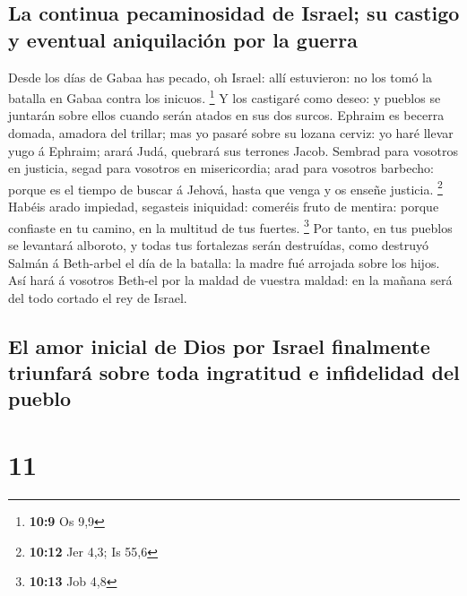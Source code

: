 \hypertarget{la-continua-pecaminosidad-de-israel-su-castigo-y-eventual-aniquilaciuxf3n-por-la-guerra}{%
\subsection{La continua pecaminosidad de Israel; su castigo y eventual
aniquilación por la
guerra}\label{la-continua-pecaminosidad-de-israel-su-castigo-y-eventual-aniquilaciuxf3n-por-la-guerra}}

 Desde los días de Gabaa has pecado, oh Israel: allí
estuvieron: no los tomó la batalla en Gabaa contra los inicuos.
\footnote{\textbf{10:9} Os 9,9}  Y los castigaré como
deseo: y pueblos se juntarán sobre ellos cuando serán atados en sus dos
surcos.  Ephraim es becerra domada, amadora del trillar;
mas yo pasaré sobre su lozana cerviz: yo haré llevar yugo á Ephraim;
arará Judá, quebrará sus terrones Jacob.  Sembrad para
vosotros en justicia, segad para vosotros en misericordia; arad para
vosotros barbecho: porque es el tiempo de buscar á Jehová, hasta que
venga y os enseñe justicia. \footnote{\textbf{10:12} Jer 4,3; Is 55,6}
 Habéis arado impiedad, segasteis iniquidad: comeréis
fruto de mentira: porque confiaste en tu camino, en la multitud de tus
fuertes. \footnote{\textbf{10:13} Job 4,8}  Por tanto, en
tus pueblos se levantará alboroto, y todas tus fortalezas serán
destruídas, como destruyó Salmán á Beth-arbel el día de la batalla: la
madre fué arrojada sobre los hijos.  Así hará á vosotros
Beth-el por la maldad de vuestra maldad: en la mañana será del todo
cortado el rey de Israel.

\hypertarget{el-amor-inicial-de-dios-por-israel-finalmente-triunfaruxe1-sobre-toda-ingratitud-e-infidelidad-del-pueblo}{%
\subsection{El amor inicial de Dios por Israel finalmente triunfará
sobre toda ingratitud e infidelidad del
pueblo}\label{el-amor-inicial-de-dios-por-israel-finalmente-triunfaruxe1-sobre-toda-ingratitud-e-infidelidad-del-pueblo}}

\hypertarget{section-10}{%
\section{11}\label{section-10}}

